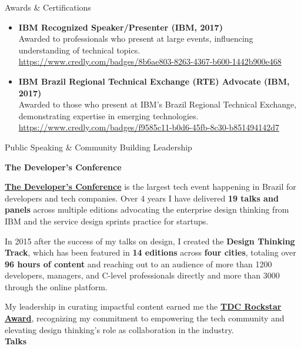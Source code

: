 \documentclass{resume} %
\begin{document}
\begin{rSection}{Awards \& Certifications}
\begin{itemize}
    \item \textbf{IBM Recognized Speaker/Presenter (IBM, 2017)} \\
    Awarded to professionals who present at large events, influencing understanding of technical topics. \\
    \url{https://www.credly.com/badges/8b6ae803-8263-4367-b600-1442b900e468}
    
    \item \textbf{IBM Brazil Regional Technical Exchange (RTE) Advocate (IBM, 2017)} \\
    Awarded to those who present at IBM's Brazil Regional Technical Exchange, demonstrating expertise in emerging technologies. \\
    \url{https://www.credly.com/badges/f9585c11-b0d6-45fb-8c30-b851494142d7}
\end{itemize}


\begin{rSection}{Public Speaking \& Community Building Leadership} 

\textbf{The Developer's Conference}

\href{https://thedevconf.com/}{\textbf{The Developer's Conference}} is the largest tech event happening in Brazil for developers and tech companies. Over 4 years I have delivered \textbf{19 talks and panels} across multiple editions advocating the enterprise design thinking from IBM and the service design sprints practice for startups.

In 2015 after the success of my talks on design, I created the \textbf{Design Thinking Track}, which has been featured in \textbf{14 editions} across \textbf{four cities}, totaling over \textbf{96 hours of content} and reaching out to an audience of more than 1200 developers, managers, and C-level professionals directly and more than 3000 through the online platform. 

My leadership in curating impactful content earned me the \textbf{\href{https://thedevconf.com/rockstar/AdilsonChicoria}{TDC Rockstar Award}}, recognizing my commitment to empowering the tech community and elevating design thinking’s role as collaboration in the industry.\\

\textbf{Talks}


\end{rSection}
\end{rSection}
\end{document}

